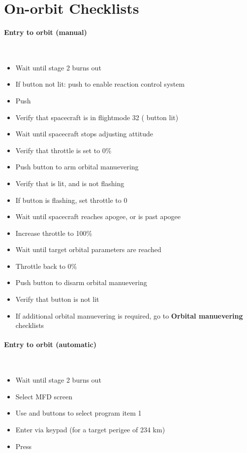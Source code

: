 \section{On-orbit Checklists}
\paragraph{Entry to orbit (manual)}~
\begin{itemize}
  \item Wait until stage 2 burns out
	\item If  button not lit: push  to enable reaction control system
	\item Push 
	\item Verify that spacecraft is in flightmode 32 ( button lit)
	\item Wait until spacecraft stops adjusting attitude
	\item Verify that throttle is set to 0\%
	\item Push  button to arm orbital manuevering
	\item Verify that  is lit, and is not flashing
	\item If  button is flashing, set throttle to 0
	\item Wait until spacecraft reaches apogee, or is past apogee
	\item Increase throttle to 100\%
	\item Wait until target orbital parameters are reached
	\item Throttle back to 0\%
	\item Push  button to disarm orbital manuevering
	\item Verify that  button is not lit
	
	\item If additional orbital manuevering is required, go to \textbf{Orbital manuevering} checklists
\end{itemize}

\paragraph{Entry to orbit (automatic)}~
\begin{itemize}
  \item Wait until stage 2 burns out
  \item Select  MFD screen
  \item Use \reg{+} and \reg{-} buttons to select program item 1
  \item Enter via keypad  (for a target perigee of 234 km)
  \item Press   
\end{itemize}



